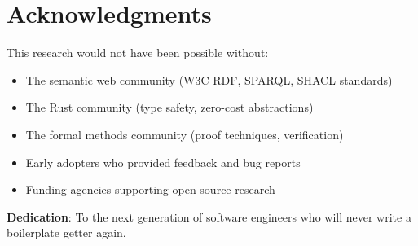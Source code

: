 \section{Acknowledgments}

This research would not have been possible without:

\begin{itemize}
    \item The semantic web community (W3C RDF, SPARQL, SHACL standards)
    \item The Rust community (type safety, zero-cost abstractions)
    \item The formal methods community (proof techniques, verification)
    \item Early adopters who provided feedback and bug reports
    \item Funding agencies supporting open-source research
\end{itemize}

\textbf{Dedication}: To the next generation of software engineers who will never write a boilerplate getter again.
